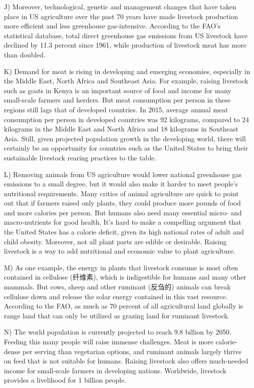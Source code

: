 \documentclass[UTF8,11pt]{ctexart}
\begin{document}
J) Moreover, technological, genetic and management changes that have taken place in US agriculture over the past 70 years have made livestock production more efficient and less greenhouse gas-intensive. According to the FAO’s statistical database, total direct greenhouse gas emissions from US livestock have declined by 11.3 percent since 1961, while production of livestock meat has more than doubled.


K) Demand for meat is rising in developing and emerging economies, especially in the Middle East, North Africa and Southeast Asia. For example, raising livestock such as goats in Kenya is an important source of food and income for many small-scale farmers and herders. But meat consumption per person in these regions still lags that of developed countries. In 2015, average annual meat consumption per person in developed countries was 92 kilograms, compared to 24 kilograms in the Middle East and North Africa and 18 kilograms in Southeast Asia. Still, given projected population growth in the developing world, there will certainly be an opportunity for countries such as the United States to bring their sustainable livestock rearing practices to the table.


L) Removing animals from US agriculture would lower national greenhouse gas emissions to a small degree, but it would also make it harder to meet people’s nutritional requirements. Many critics of animal agriculture are quick to point out that if farmers raised only plants, they could produce more pounds of food and more calories per person. But humans also need many essential micro- and macro-nutrients for good health. It’s hard to make a compelling argument that the United States has a calorie deficit, given its high national rates of adult and child obesity. Moreover, not all plant parts are edible or desirable. Raising livestock is a way to add nutritional and economic value to plant agriculture.


M) As one example, the energy in plants that livestock consume is most often contained in cellulose (纤维素), which is indigestible for humans and many other mammals. But cows, sheep and other ruminant (反刍的) animals can break cellulose down and release the solar energy contained in this vast resource. According to the FAO, as much as 70 percent of all agricultural land globally is range land that can only be utilized as grazing land for ruminant livestock.


N) The world population is currently projected to reach 9.8 billion by 2050. Feeding this many people will raise immense challenges. Meat is more calorie-dense per serving than vegetarian options, and ruminant animals largely thrive on feed that is not suitable for humans. Raising livestock also offers much-needed income for small-scale farmers in developing nations. Worldwide, livestock provides a livelihood for 1 billion people.
\end{document}
